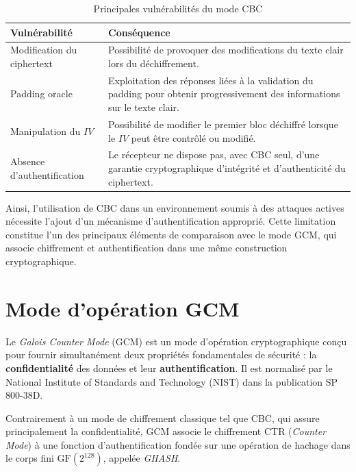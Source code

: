 \documentclass[12pt,a4paper]{article}
\begin{document}
\begin{table}[H]
\centering
\caption{Principales vulnérabilités du mode CBC}
\renewcommand{\arraystretch}{1.35}
\setlength{\tabcolsep}{6pt}

\begin{tabular}{|p{4.2cm}|p{8.8cm}|}
\hline
\textbf{Vulnérabilité} & \textbf{Conséquence} \\
\hline

Modification du ciphertext &
Possibilité de provoquer des modifications du texte clair lors du
déchiffrement. \\
\hline

Padding oracle &
Exploitation des réponses liées à la validation du padding pour
obtenir progressivement des informations sur le texte clair. \\
\hline

Manipulation du $IV$ &
Possibilité de modifier le premier bloc déchiffré lorsque le $IV$
peut être contrôlé ou modifié. \\
\hline

Absence d'authentification &
Le récepteur ne dispose pas, avec CBC seul, d'une garantie
cryptographique d'intégrité et d'authenticité du ciphertext. \\
\hline

\end{tabular}
\end{table}

Ainsi, l'utilisation de CBC dans un environnement soumis à des
attaques actives nécessite l'ajout d'un mécanisme d'authentification
approprié. Cette limitation constitue l'un des principaux éléments de
comparaison avec le mode GCM, qui associe chiffrement et
authentification dans une même construction cryptographique.


\section{Mode d'opération GCM}
\label{sec:gcm}

Le \textit{Galois Counter Mode} (GCM) est un mode d'opération
cryptographique conçu pour fournir simultanément deux propriétés
fondamentales de sécurité : la \textbf{confidentialité} des données
et leur \textbf{authentification}. Il est normalisé par le National
Institute of Standards and Technology (NIST) dans la publication
SP 800-38D.

Contrairement à un mode de chiffrement classique tel que CBC, qui
assure principalement la confidentialité, GCM associe le chiffrement
CTR (\textit{Counter Mode}) à une fonction d'authentification fondée
sur une opération de hachage dans le corps fini
$\mathrm{GF}(2^{128})$, appelée \textit{GHASH}.
\end{document}
